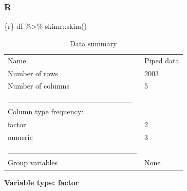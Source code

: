 \documentclass[
  letterpaper,
  DIV=11,
  numbers=noendperiod,
  oneside]{scrreprt}
\newenvironment{Shaded}{\begin{snugshade}}{\end{snugshade}}
\newcommand{\FunctionTok}[1]{\textcolor[rgb]{0.28,0.35,0.67}{#1}}
\newcommand{\InformationTok}[1]{\textcolor[rgb]{0.37,0.37,0.37}{#1}}
\newcommand{\NormalTok}[1]{\textcolor[rgb]{0.00,0.23,0.31}{#1}}
\newcommand{\SpecialCharTok}[1]{\textcolor[rgb]{0.37,0.37,0.37}{#1}}
\begin{document}
\hypertarget{r-12}{%
\subsubsection{R}\label{r-12}}

\begin{Shaded}
\begin{Highlighting}[]
\InformationTok{\textasciigrave{}\textasciigrave{}\textasciigrave{}\{r\}}
\NormalTok{df }\SpecialCharTok{\%\textgreater{}\%}
\NormalTok{  skimr}\SpecialCharTok{::}\FunctionTok{skim}\NormalTok{()}
\InformationTok{\textasciigrave{}\textasciigrave{}\textasciigrave{}}
\end{Highlighting}
\end{Shaded}

\begin{longtable}[]{@{}ll@{}}
\caption{Data summary}\tabularnewline
\toprule()
\endhead
Name & Piped data \\
Number of rows & 2003 \\
Number of columns & 5 \\
\_\_\_\_\_\_\_\_\_\_\_\_\_\_\_\_\_\_\_\_\_\_\_ & \\
Column type frequency: & \\
factor & 2 \\
numeric & 3 \\
\_\_\_\_\_\_\_\_\_\_\_\_\_\_\_\_\_\_\_\_\_\_\_\_ & \\
Group variables & None \\
\bottomrule()
\end{longtable}

\textbf{Variable type: factor}
\end{document}
